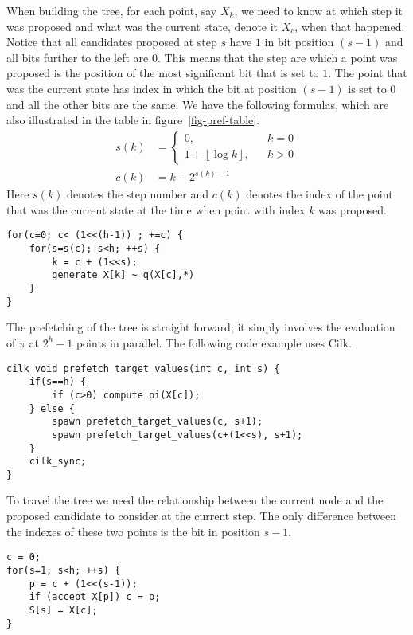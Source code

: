 \documentclass[11pt,letterpaper]{article}       %
\begin{document}
When building the tree, for each point, say $X_k$, we need to know at which step 
it was proposed and what was the current state, denote it $X_c$, 
when that happened.  Notice that all candidates proposed at step $s$ have 
$1$ in bit position $(s-1)$ and all bits further to the left are $0$.  This means
that the step are which a point was proposed is the position of the most 
significant bit that is set to $1$.  The point that was the current state 
has index in which the bit at position $(s-1)$ is set to $0$ and all the 
other bits are the same.  We have the following formulas, which are also 
illustrated in the table in figure~\ref{fig-pref-table}.
\begin{align*}
s(k) &= \left\{ \begin{aligned} 0, && k=0 \\ 1+\left\lfloor\log k\right\rfloor, && k>0 \end{aligned}
\right.  \\
c(k) &= k - 2^{s(k)-1}
\end{align*}
Here $s(k)$ denotes the step number and $c(k)$ denotes the index of the point 
that was the current state at the time when point with index $k$ was proposed.
\begin{Verbatim}[frame=single]
for(c=0; c< (1<<(h-1)) ; +=c) {
    for(s=s(c); s<h; ++s) { 
        k = c + (1<<s);
        generate X[k] ~ q(X[c],*)
    }
}
\end{Verbatim}

The prefetching of the tree is straight forward;  it simply involves the 
evaluation of $\pi$ at $2^h-1$ points in parallel.  The following code 
example uses Cilk.
\begin{Verbatim}[frame=single]
cilk void prefetch_target_values(int c, int s) {
    if(s==h) {
        if (c>0) compute pi(X[c]);
    } else {
        spawn prefetch_target_values(c, s+1);
        spawn prefetch_target_values(c+(1<<s), s+1);
    }
    cilk_sync;
}
\end{Verbatim}

To travel the tree we need the relationship between the current node and the 
proposed candidate to consider at the current step.  The only difference between 
the indexes of these two points is the bit in position $s-1$.
\begin{Verbatim}[frame=single]
c = 0;
for(s=1; s<h; ++s) {
    p = c + (1<<(s-1));
    if (accept X[p]) c = p;
    S[s] = X[c];
}
\end{Verbatim}

\end{document}
